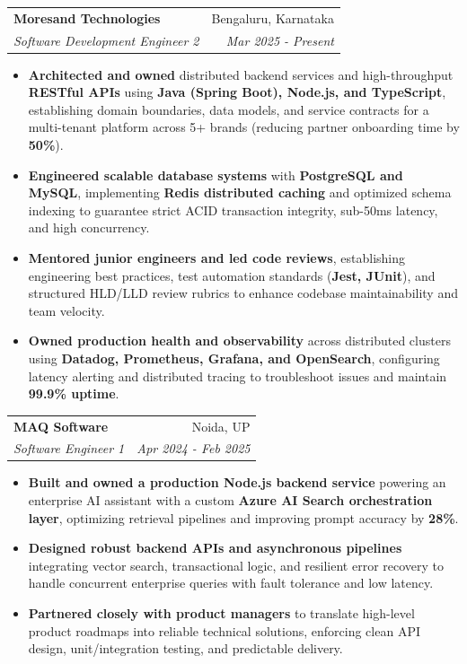 \documentclass[a4paper,10pt]{article}
\makeatletter
\newcommand{\resumeSubheading}[4]{
  \vspace{-1pt}\item
    \begin{tabular*}{0.97\textwidth}{l@{\extracolsep{\fill}}r}
      \textbf{#1} & #2 \\
      \textit{#3} & \textit{#4} \\
    \end{tabular*}\vspace{-5pt}
}
\newcommand{\resumeItemListStart}{\begin{itemize}}
\newcommand{\resumeItemListEnd}{\end{itemize}\vspace{-5pt}}
\makeatother
\begin{document}
    \resumeSubheading{Moresand Technologies}{Bengaluru, Karnataka}
      {Software Development Engineer 2}{Mar 2025 - Present}
      \resumeItemListStart
        \item \textnormal{\textbf{Architected and owned} distributed backend services and high-throughput \textbf{RESTful APIs} using \textbf{Java (Spring Boot), Node.js, and TypeScript}, establishing domain boundaries, data models, and service contracts for a multi-tenant platform across 5+ brands (reducing partner onboarding time by \textbf{50\%}).}
        \item \textnormal{\textbf{Engineered scalable database systems} with \textbf{PostgreSQL and MySQL}, implementing \textbf{Redis distributed caching} and optimized schema indexing to guarantee strict ACID transaction integrity, sub-50ms latency, and high concurrency.}
        \item \textnormal{\textbf{Mentored junior engineers and led code reviews}, establishing engineering best practices, test automation standards (\textbf{Jest, JUnit}), and structured HLD/LLD review rubrics to enhance codebase maintainability and team velocity.}
        \item \textnormal{\textbf{Owned production health and observability} across distributed clusters using \textbf{Datadog, Prometheus, Grafana, and OpenSearch}, configuring latency alerting and distributed tracing to troubleshoot issues and maintain \textbf{99.9\% uptime}.}
      \resumeItemListEnd

    \resumeSubheading{MAQ Software}{Noida, UP}
      {Software Engineer 1}{Apr 2024 - Feb 2025}
      \resumeItemListStart
        \item \textnormal{\textbf{Built and owned a production Node.js backend service} powering an enterprise AI assistant with a custom \textbf{Azure AI Search orchestration layer}, optimizing retrieval pipelines and improving prompt accuracy by \textbf{28\%}.}
        \item \textnormal{\textbf{Designed robust backend APIs and asynchronous pipelines} integrating vector search, transactional logic, and resilient error recovery to handle concurrent enterprise queries with fault tolerance and low latency.}
        \item \textnormal{\textbf{Partnered closely with product managers} to translate high-level product roadmaps into reliable technical solutions, enforcing clean API design, unit/integration testing, and predictable delivery.}
      \resumeItemListEnd
\end{document}

